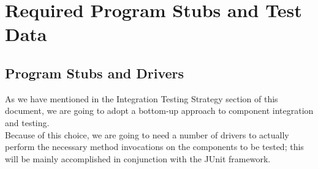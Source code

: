 \documentclass[a4paper, hidelinks, 12pt]{report}
\begin{document}
	\chapter{Required Program Stubs and Test Data}
	\section{Program Stubs and Drivers}
	As we have mentioned in the Integration Testing Strategy section of this document, we are going to adopt a bottom-up approach to component integration and testing.\\
	
	Because of this choice, we are going to need a number of drivers to actually perform the necessary method invocations on the components to be tested; this will be mainly accomplished in conjunction with the JUnit framework.\\
	
\end{document}
